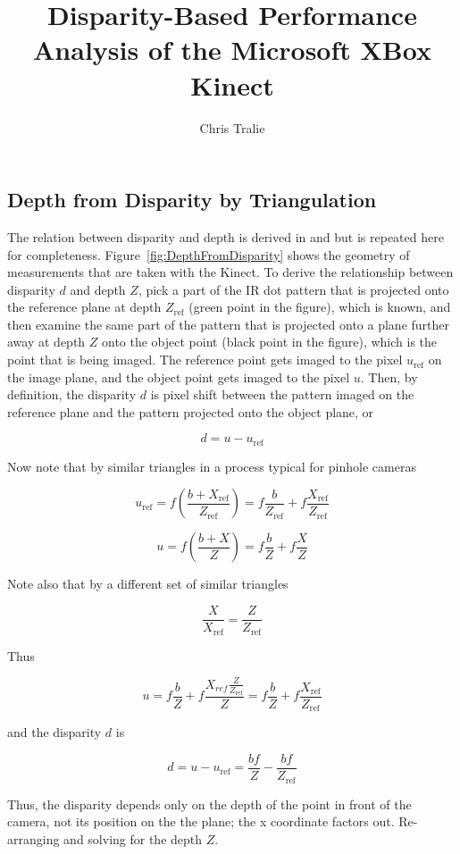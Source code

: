 \documentclass{article}
\title{Disparity-Based Performance Analysis of the Microsoft XBox Kinect}
\author{Chris Tralie}
\begin{document}
\maketitle


\subsection{Depth from Disparity by Triangulation}
\label{sec:DepthFromDisparity}

The relation between disparity and depth is derived in \cite{khoshelham2012accuracy} and \cite{KonoligeCalibrationTechnical} but is repeated here for completeness.  Figure~\ref{fig:DepthFromDisparity} shows the geometry of measurements that are taken with the Kinect.  To derive the relationship between disparity $d$ and depth $Z$, pick a part of the IR dot pattern that is projected onto the reference plane at depth $Z_{\text{ref}}$ (green point in the figure), which is known, and then examine the same part of the pattern that is projected onto a plane further away at depth $Z$ onto the object point (black point in the figure), which is the point that is being imaged.  The reference point gets imaged to the pixel $u_{\text{ref}}$ on the image plane, and the object point gets imaged to the pixel $u$.  Then, by definition, the disparity $d$ is pixel shift between the pattern imaged on the reference plane and the pattern projected onto the object plane, or

\[ d = u - u_{\text{ref}} \]

Now note that by similar triangles in a process typical for pinhole cameras

\[ u_{\text{ref}} = f (\frac{b + X_{\text{ref}}}{Z_{\text{ref}}}) = f \frac{b}{Z_{\text{ref}}} + f \frac{X_{\text{ref}}}{Z_{\text{ref}}} \]

\[ u = f (\frac{b + X}{Z}) = f \frac{b}{Z} + f \frac{X}{Z} \]

Note also that by a different set of similar triangles

\[ \frac{X}{X_{\text{ref}}} = \frac{Z}{Z_{\text{ref}}} \]

Thus

\[ u = f \frac{b}{Z} + f \frac{X_{ref} \frac{Z}{Z_{\text{ref}}}}{Z} = f \frac{b}{Z} + f \frac{X_{\text{ref}}}{Z_{\text{ref}}}\]

and the disparity $d$ is 

\[ d = u - u_{\text{ref}} = \frac{bf}{Z} - \frac{bf}{Z_{\text{ref}}}\]

Thus, the disparity depends only on the depth of the point in front of the camera, not its position on the the plane; the x coordinate factors out.  Re-arranging and solving for the depth $Z$.
\end{document}
